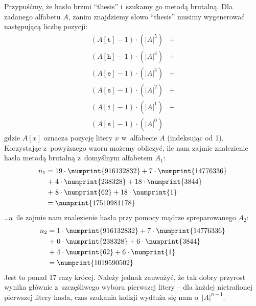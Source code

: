 \documentclass[12pt,a4paper,twoside]{article}
\begin{document}
\pagebreak Przypuśćmy, że hasło brzmi ``thesis'' i~szukamy go metodą brutalną.
Dla zadanego alfabetu $A$, zanim znajdziemy słowo ``thesis'' musimy wygenerować
następującą liczbę pozycji:
    \[
        \begin{aligned}
        (A[\mathtt{t}]-1)\cdot(|A|^5) &+\\
        (A[\mathtt{h}]-1)\cdot(|A|^4) &+\\
        (A[\mathtt{e}]-1)\cdot(|A|^3) &+\\
        (A[\mathtt{s}]-1)\cdot(|A|^2) &+\\
        (A[\mathtt{i}]-1)\cdot(|A|^1) &+\\
        (A[\mathtt{s}]-1)\cdot(|A|^0)
        \end{aligned}
    \]
gdzie $A[x]$ oznacza pozycję litery $x$ w~alfabecie $A$ (indeksując od 1).
Korzystając z~powyższego wzoru możemy obliczyć, ile nam zajmie znalezienie
hasła metodą brutalną z~domyślnym alfabetem $A_1$:
    \[
        \begin{aligned}
        n_1=\;&19 \cdot \numprint{916132832} + 7 \cdot \numprint{14776336}\\
        +\;&4 \cdot \numprint{238328} + 18 \cdot \numprint{3844}\\
        +\;&8 \cdot \numprint{62} + 18 \cdot \numprint{1}\\
        =\;&\numprint{17510981178}
        \end{aligned}
    \]
\ldots a~ile zajmie nam znalezienie hasła przy pomocy mądrze spreparowanego
$A_2$:
    \[
        \begin{aligned}
        n_2=\;&1 \cdot \numprint{916132832} + 7 \cdot \numprint{14776336}\\
        +\;&0 \cdot \numprint{238328} + 6 \cdot \numprint{3844}\\
        +\;&4 \cdot \numprint{62} + 6 \cdot \numprint{1}\\
        =\;&\numprint{1019590502}
        \end{aligned}
    \]
Jest to ponad 17 razy krócej. Należy jednak zauważyć, że tak dobry przyrost
wynika głównie z~szczęśliwego wyboru pierwszej litery -- dla każdej
nietrafionej pierwszej litery hasła, czas szukania kolizji wydłuża się nam
o~$|A|^{n-1}$.
\end{document}
